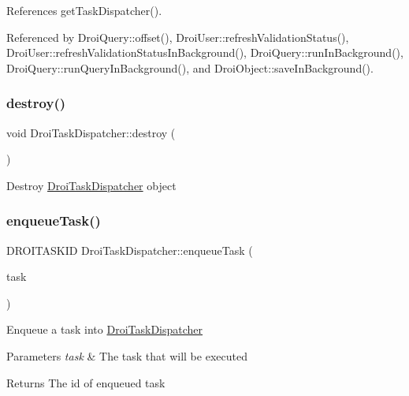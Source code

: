 References get\+Task\+Dispatcher().



Referenced by Droi\+Query\+::offset(), Droi\+User\+::refresh\+Validation\+Status(), Droi\+User\+::refresh\+Validation\+Status\+In\+Background(), Droi\+Query\+::run\+In\+Background(), Droi\+Query\+::run\+Query\+In\+Background(), and Droi\+Object\+::save\+In\+Background().

\mbox{\label{class_droi_task_dispatcher_a678e5ab213ca9da9ff9436aaabddb258}} 
\subsubsection{\texorpdfstring{destroy()}{destroy()}}
{\footnotesize\ttfamily void Droi\+Task\+Dispatcher\+::destroy (\begin{DoxyParamCaption}{ }\end{DoxyParamCaption})}

Destroy \hyperlink{class_droi_task_dispatcher}{Droi\+Task\+Dispatcher} object \mbox{\label{class_droi_task_dispatcher_a2ba8675d058bbe2e65306381de60030b}} 
\subsubsection{\texorpdfstring{enqueue\+Task()}{enqueueTask()}\hspace{0.1cm}{\footnotesize\ttfamily [1/4]}}
{\footnotesize\ttfamily D\+R\+O\+I\+T\+A\+S\+K\+ID Droi\+Task\+Dispatcher\+::enqueue\+Task (\begin{DoxyParamCaption}\item[{const D\+R\+O\+I\+T\+A\+SK \&}]{task }\end{DoxyParamCaption})}

Enqueue a task into \hyperlink{class_droi_task_dispatcher}{Droi\+Task\+Dispatcher} 
\begin{DoxyParams}{Parameters}
{\em task} & The task that will be executed \\
\hline
\end{DoxyParams}
\begin{DoxyReturn}{Returns}
The id of enqueued task 
\end{DoxyReturn}


